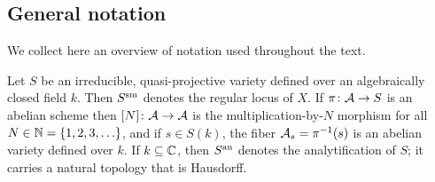  
 
\subsection{General notation}
We collect here an overview of notation used throughout the text. 

Let $S$ be an irreducible, quasi-projective variety defined over an
algebraically closed field $k$. Then ${S}^{\mathrm{sm}}$ denotes the regular
locus of $X$. If $\pi\colon \mathcal{A}\rightarrow S$ is an abelian scheme
then $[N]\colon \mathcal{A}\rightarrow\mathcal{A}$ is the multiplication-by-$N$
morphism for all $N\in{\mathbb{N}}=\{1,2,3,\ldots\}$, and if $s\in S(k)$, the fiber
$\mathcal{A}_s=\pi^{-1}(s)$ is an abelian variety defined over $k$.
If $k\subseteq {\mathbb{C}}$, then
${S}^{\mathrm{an}}$ denotes the analytification of $S$; it carries a natural
topology that is Hausdorff.

